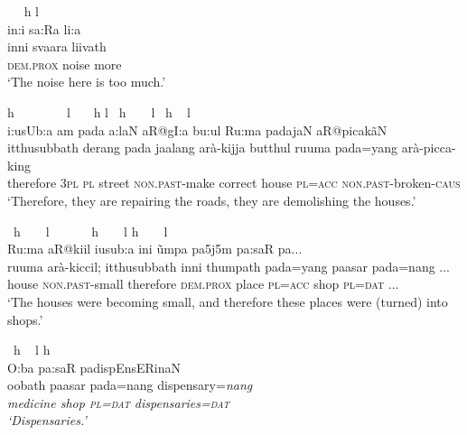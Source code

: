 \ea \label{K051222nar04.37}
\gllll ~ ~h \hspace{0.7cm}l\\
 in:i s\V a:Ra li:\V a\dentt\\
 inni svaara liivath\\
 \textsc{dem.prox} noise more\\
`The noise here is too much.'
\z


\ea \label{K051222nar04.38}
\gllll \hspace{1.4cm}h   ~         ~~~~~~l ~~~h            \hspace{1.1cm}l ~h~~~~l  ~h ~ \hspace{1.6cm}l \\
  i\dentt:usUb:a\dentt{} \dz@\rz am pada \texttoptiebar{\J\textctz}a:laN aR@gI\J:a bu\dentt:ul Ru:ma padajaN aR@picak\~aN\\
 itthusubbath derang pada jaalang arà-kijja butthul ruuma pada=yang arà-picca-king\\
 therefore \textsc{3pl} \textsc{pl} street \textsc{non.past}-make correct house \textsc{pl}=\textsc{acc} \textsc{non.past}-broken-\textsc{caus}\\
`Therefore, they are repairing the roads, they are demolishing the houses.'
\z


\ea \label{K051222nar04.39}
\gllll ~h~~~~l ~~~~~~h~~~~l \hspace{1.3cm}h ~      ~                    \hspace{1.1cm}l \\
 Ru:ma aR@kiil i\dentt usub:a\dentt{} ini \dentt\~umpa\dentt{} pa\dz 5j5m pa:saR pa\dz@naN ...\\
 ruuma arà-kiccil; itthusubbath inni thumpath pada=yang paasar pada=nang ...\footnotemark{} \\
 house \textsc{non.past}-small therefore \textsc{dem.prox} place  \textsc{pl}=\textsc{acc} shop  \textsc{pl}=\textsc{dat} ...\\
`The houses were becoming small, and therefore these places were (turned) into shops.'
\z



\ea \label{K051222nar04.40}
\gllll ~h      ~     \hspace{1.1cm}l \hspace{0.7cm}h\\
 O:ba\dentt{} pa:saR pa\dz@n@n dispEnsERinaN\\
 oobath paasar pada=nang \rm dispensary=\it nang\\
 medicine shop  \textsc{pl}=\textsc{dat} dispensaries=\textsc{dat}       \\
`Dispensaries.'
\z

